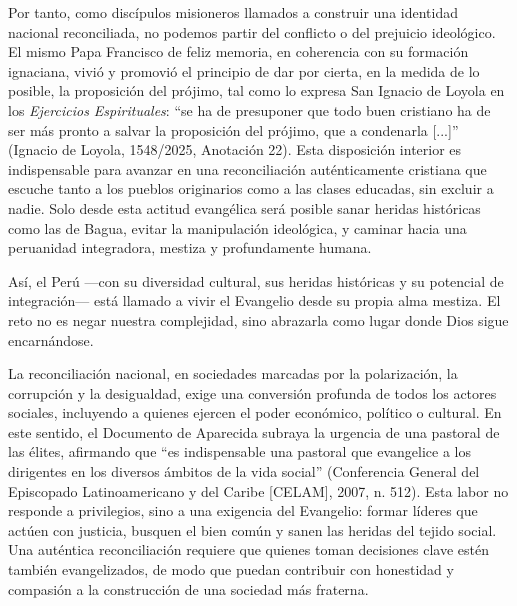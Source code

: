 \documentclass[12pt]{article}
\begin{document}
Por tanto, como discípulos misioneros llamados a construir una identidad nacional reconciliada, no podemos partir del conflicto o del prejuicio ideológico. El mismo Papa Francisco de feliz memoria, en coherencia con su formación ignaciana, vivió y promovió el principio de dar por cierta, en la medida de lo posible, la proposición del prójimo, tal como lo expresa San Ignacio de Loyola en los \emph{Ejercicios Espirituales}: ``se ha de presuponer que todo buen cristiano ha de ser más pronto a salvar la proposición del prójimo, que a condenarla [...]'' (Ignacio de Loyola, 1548/2025, Anotación 22). Esta disposición interior es indispensable para avanzar en una reconciliación auténticamente cristiana que escuche tanto a los pueblos originarios como a las clases educadas, sin excluir a nadie. Solo desde esta actitud evangélica será posible sanar heridas históricas como las de Bagua, evitar la manipulación ideológica, y caminar hacia una peruanidad integradora, mestiza y profundamente humana.

Así, el Perú ---con su diversidad cultural, sus heridas históricas y su potencial de integración--- está llamado a vivir el Evangelio desde su propia alma mestiza. El reto no es negar nuestra complejidad, sino abrazarla como lugar donde Dios sigue encarnándose.

La reconciliación nacional, en sociedades marcadas por la polarización, la corrupción y la desigualdad, exige una conversión profunda de todos los actores sociales, incluyendo a quienes ejercen el poder económico, político o cultural. En este sentido, el Documento de Aparecida subraya la urgencia de una pastoral de las élites, afirmando que ``es indispensable una pastoral que evangelice a los dirigentes en los diversos ámbitos de la vida social'' (Conferencia General del Episcopado Latinoamericano y del Caribe [CELAM], 2007, n. 512). Esta labor no responde a privilegios, sino a una exigencia del Evangelio: formar líderes que actúen con justicia, busquen el bien común y sanen las heridas del tejido social. Una auténtica reconciliación requiere que quienes toman decisiones clave estén también evangelizados, de modo que puedan contribuir con honestidad y compasión a la construcción de una sociedad más fraterna.


	
	
\end{document}
